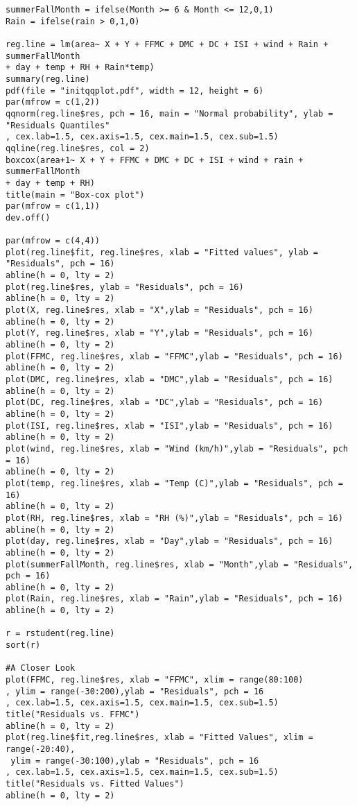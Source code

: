 \documentclass[11pt]{report}
\begin{document}
\begin{verbatim}
summerFallMonth = ifelse(Month >= 6 & Month <= 12,0,1)
Rain = ifelse(rain > 0,1,0)

reg.line = lm(area~ X + Y + FFMC + DMC + DC + ISI + wind + Rain + summerFallMonth 
+ day + temp + RH + Rain*temp)
summary(reg.line)
pdf(file = "initqqplot.pdf", width = 12, height = 6)
par(mfrow = c(1,2))
qqnorm(reg.line$res, pch = 16, main = "Normal probability", ylab = "Residuals Quantiles"
, cex.lab=1.5, cex.axis=1.5, cex.main=1.5, cex.sub=1.5)
qqline(reg.line$res, col = 2)
boxcox(area+1~ X + Y + FFMC + DMC + DC + ISI + wind + rain + summerFallMonth 
+ day + temp + RH)
title(main = "Box-cox plot")
par(mfrow = c(1,1))
dev.off()

par(mfrow = c(4,4))
plot(reg.line$fit, reg.line$res, xlab = "Fitted values", ylab = "Residuals", pch = 16)
abline(h = 0, lty = 2)
plot(reg.line$res, ylab = "Residuals", pch = 16)
abline(h = 0, lty = 2)
plot(X, reg.line$res, xlab = "X",ylab = "Residuals", pch = 16)
abline(h = 0, lty = 2)
plot(Y, reg.line$res, xlab = "Y",ylab = "Residuals", pch = 16)
abline(h = 0, lty = 2)
plot(FFMC, reg.line$res, xlab = "FFMC",ylab = "Residuals", pch = 16)
abline(h = 0, lty = 2)
plot(DMC, reg.line$res, xlab = "DMC",ylab = "Residuals", pch = 16)
abline(h = 0, lty = 2)
plot(DC, reg.line$res, xlab = "DC",ylab = "Residuals", pch = 16)
abline(h = 0, lty = 2)
plot(ISI, reg.line$res, xlab = "ISI",ylab = "Residuals", pch = 16)
abline(h = 0, lty = 2)
plot(wind, reg.line$res, xlab = "Wind (km/h)",ylab = "Residuals", pch = 16)
abline(h = 0, lty = 2)
plot(temp, reg.line$res, xlab = "Temp (C)",ylab = "Residuals", pch = 16)
abline(h = 0, lty = 2)
plot(RH, reg.line$res, xlab = "RH (%)",ylab = "Residuals", pch = 16)
abline(h = 0, lty = 2)
plot(day, reg.line$res, xlab = "Day",ylab = "Residuals", pch = 16)
abline(h = 0, lty = 2)
plot(summerFallMonth, reg.line$res, xlab = "Month",ylab = "Residuals", pch = 16)
abline(h = 0, lty = 2)
plot(Rain, reg.line$res, xlab = "Rain",ylab = "Residuals", pch = 16)
abline(h = 0, lty = 2)

r = rstudent(reg.line)
sort(r)

#A Closer Look
plot(FFMC, reg.line$res, xlab = "FFMC", xlim = range(80:100)
, ylim = range(-30:200),ylab = "Residuals", pch = 16
, cex.lab=1.5, cex.axis=1.5, cex.main=1.5, cex.sub=1.5)
title("Residuals vs. FFMC")
abline(h = 0, lty = 2)
plot(reg.line$fit,reg.line$res, xlab = "Fitted Values", xlim = range(-20:40),
 ylim = range(-30:100),ylab = "Residuals", pch = 16
, cex.lab=1.5, cex.axis=1.5, cex.main=1.5, cex.sub=1.5)
title("Residuals vs. Fitted Values")
abline(h = 0, lty = 2)


\end{verbatim}
\end{document}
